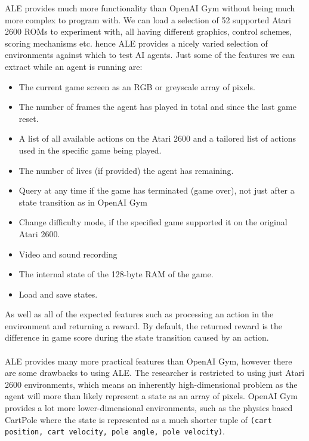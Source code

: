 ALE provides much more functionality than OpenAI Gym without being much more complex to program with. We can load a selection of 52 supported Atari 2600 ROMs to experiment with, all having different graphics, control schemes, scoring mechanisms etc. hence ALE provides a nicely varied selection of environments against which to test AI agents. Just some of the features we can extract while an agent is running are:
\begin{itemize}
    \item The current game screen as an RGB or greyscale array of pixels.
    \item The number of frames the agent has played in total and since the last game reset.
    \item A list of all available actions on the Atari 2600 and a tailored list of actions used in the specific game being played.
    \item The number of lives (if provided) the agent has remaining.
    \item Query at any time if the game has terminated (game over), not just after a state transition as in OpenAI Gym
    \item Change difficulty mode, if the specified game supported it on the original Atari 2600.
    \item Video and sound recording
    \item The internal state of the 128-byte RAM of the game.
    \item Load and save states.
\end{itemize}

As well as all of the expected features such as processing an action in the environment and returning a reward. By default, the returned reward is the difference in game score during the state transition caused by an action. \paragraph{}

ALE provides many more practical features than OpenAI Gym, however there are some drawbacks to using ALE. The researcher is restricted to using just Atari 2600 environments, which means an inherently high-dimensional problem as the agent will more than likely represent a state as an array of pixels. OpenAI Gym provides a lot more lower-dimensional environments, such as the physics based CartPole where the state is represented as a much shorter tuple of \texttt{(cart position, cart velocity, pole angle, pole velocity)}.
